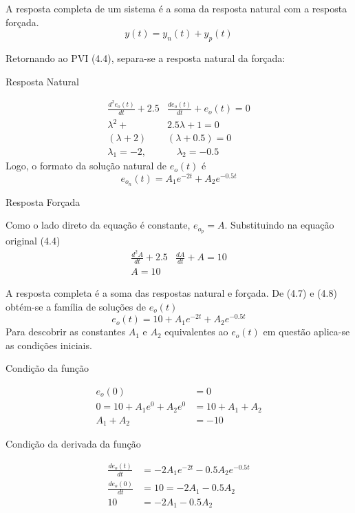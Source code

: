 \documentclass{article}
\numberwithin{equation}{section}
\begin{document}
    A resposta completa de um sistema é a soma da resposta natural com a resposta forçada. $$y(t)=y_n(t)+y_p(t)$$

    \noindent Retornando ao PVI (4.4), separa-se a resposta natural da forçada:
    \begin{center}{Resposta Natural}\end{center}
    \begin{align*}
        \frac{ d^2e_{o}(t) }{ dt } + 2.5& \frac{ de_{o}(t) }{ dt } + e_{o}(t) = 0 \\
        \lambda^{2} +& 2.5\lambda + 1 = 0 \\
        (\lambda+2)&(\lambda+0.5) = 0 \\
        \lambda_{1}=-2,& \quad \lambda_{2}=-0.5
    \end{align*}
    Logo, o formato da solução natural de $e_{o}(t)$ é
    \begin{equation}
        e_{o_n}(t) = A_{1}e^{-2t}+A_{2}e^{-0.5t}
    \end{equation}
    \vspace{0.1cm}
    \begin{center}{Resposta Forçada}\end{center}
    Como o lado direto da equação é constante, $e_{o_p} = A$. Substituindo na equação original (4.4)
    \begin{align}
        \frac{ d^2 A }{ dt } + 2.5& \frac{ d A }{ dt } + A = 10\nonumber \\
        A = 10
    \end{align}

    A resposta completa é a soma das respostas natural e forçada. De (4.7) e (4.8) obtém-se a família de soluções de $e_{o}(t)$
    \begin{equation*}
        e_{o}(t) = 10 + A_{1}e^{-2t}+A_{2}e^{-0.5t}
    \end{equation*}
    Para descobrir as constantes $A_{1}$ e $A_{2}$ equivalentes ao $e_{o}(t)$ em questão aplica-se as condições iniciais.
    \begin{center}{Condição da função}\end{center}
    \begin{align}
        e_{o}(0) &= 0 \nonumber \\
        0 = 10 + A_{1}e^{0}+A_{2}e^{0} &= 10 + A_{1} + A_{2} \nonumber \\
        A_{1} + A_{2} &= -10
    \end{align}

    \begin{center}{Condição da derivada da função}\end{center}
    \begin{align}
        \frac{de_{o}(t)}{dt} &= -2A_{1}e^{-2t}-0.5A_{2}e^{-0.5t} \nonumber \\
        \frac{de_{o}(0)}{dt} &= 10 = -2A_{1}-0.5A_{2} \nonumber \\
        10 &= -2A_{1}-0.5A_{2}
    \end{align}
\end{document}
